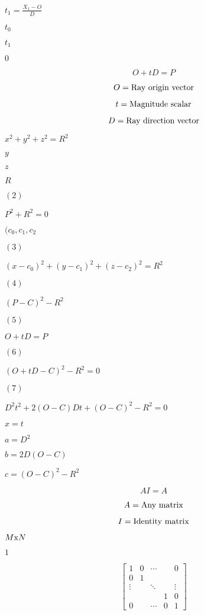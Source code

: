 \documentclass{article}
\begin{document}
$t_1=\frac{X_1-O}{D}$
\pagebreak

$t_0$
\pagebreak

$t_1$
\pagebreak

$0$
\pagebreak

\[ O+tD=P \]
\pagebreak

\[ O=\textnormal{Ray origin vector} \]
\pagebreak

\[ t=\textnormal{Magnitude scalar} \]
\pagebreak

\[ D=\textnormal{Ray direction vector} \]
\pagebreak

$x^2+y^2+z^2=R^2$
\pagebreak

$y$
\pagebreak

$z$
\pagebreak

$R$
\pagebreak

$(2)$
\pagebreak

$P^2+R^2=0$
\pagebreak

$(c_0,c_1,c_2$
\pagebreak

$(3)$
\pagebreak

$(x-c_0)^2+(y-c_1)^2+(z-c_2)^2=R^2$
\pagebreak

$(4)$
\pagebreak

$(P-C)^2-R^2$
\pagebreak

$(5)$
\pagebreak

$O+tD=P$
\pagebreak

$(6)$
\pagebreak

$(O+tD-C)^2-R^2=0$
\pagebreak

$(7)$
\pagebreak

$D^2t^2+2(O-C)Dt+(O-C)^2-R^2=0$
\pagebreak

$x=t$
\pagebreak

$a=D^2$
\pagebreak

$b=2D(O-C)$
\pagebreak

$c=(O-C)^2-R^2$
\pagebreak

\[ AI=A\]
\pagebreak

\[ A=\textnormal{Any matrix} \]
\pagebreak

\[ I=\textnormal{Identity matrix} \]
\pagebreak

$M\textnormal{x}N$
\pagebreak

$1$
\pagebreak

\[ \begin{bmatrix} 1 & 0 & \cdots & & 0 \\ 0 & 1 & & & \\ \vdots & & \ddots & & \vdots \\ & & & 1 & 0 \\ 0 & & \cdots & 0 & 1 \end{bmatrix} \]
\pagebreak
\end{document}
